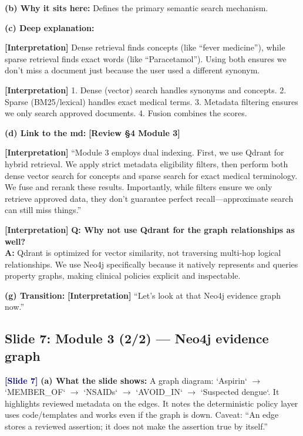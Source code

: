 \documentclass[11pt,a4paper]{article}
\newcommand{\origintag}[2]{\textcolor{#1}{\small\textbf{[#2]}}}
\begin{document}
\textbf{(b) Why it sits here:} Defines the primary semantic search mechanism.

\textbf{(c) Deep explanation:}
\begin{analogy}
\origintag{slate}{Interpretation} Dense retrieval finds concepts (like ``fever medicine''), while sparse retrieval finds exact words (like ``Paracetamol''). Using both ensures we don't miss a document just because the user used a different synonym.
\end{analogy}
\origintag{slate}{Interpretation} 1. Dense (vector) search handles synonyms and concepts. 2. Sparse (BM25/lexical) handles exact medical terms. 3. Metadata filtering ensures we only search approved documents. 4. Fusion combines the scores.

\textbf{(d) Link to the md:} \origintag{amber}{Review \S4 Module 3}

\begin{sayit}
\origintag{slate}{Interpretation} ``Module 3 employs dual indexing. First, we use Qdrant for hybrid retrieval. We apply strict metadata eligibility filters, then perform both dense vector search for concepts and sparse search for exact medical terminology. We fuse and rerank these results. Importantly, while filters ensure we only retrieve approved data, they don't guarantee perfect recall---approximate search can still miss things.''
\end{sayit}

\begin{qa}
\origintag{slate}{Interpretation} \textbf{Q: Why not use Qdrant for the graph relationships as well?} \\
\textbf{A:} Qdrant is optimized for vector similarity, not traversing multi-hop logical relationships. We use Neo4j specifically because it natively represents and queries property graphs, making clinical policies explicit and inspectable.
\end{qa}
\textbf{(g) Transition:} \origintag{slate}{Interpretation} ``Let's look at that Neo4j evidence graph now.''

\subsection{Slide 7: Module 3 (2/2) --- Neo4j evidence graph}
\origintag{navy}{Slide 7}
\textbf{(a) What the slide shows:} A graph diagram: `Aspirin` $\rightarrow$ `MEMBER\_OF` $\rightarrow$ `NSAIDs` $\rightarrow$ `AVOID\_IN` $\rightarrow$ `Suspected dengue`. It highlights reviewed metadata on the edges. It notes the deterministic policy layer uses code/templates and works even if the graph is down. Caveat: ``An edge stores a reviewed assertion; it does not make the assertion true by itself.''
\end{document}

